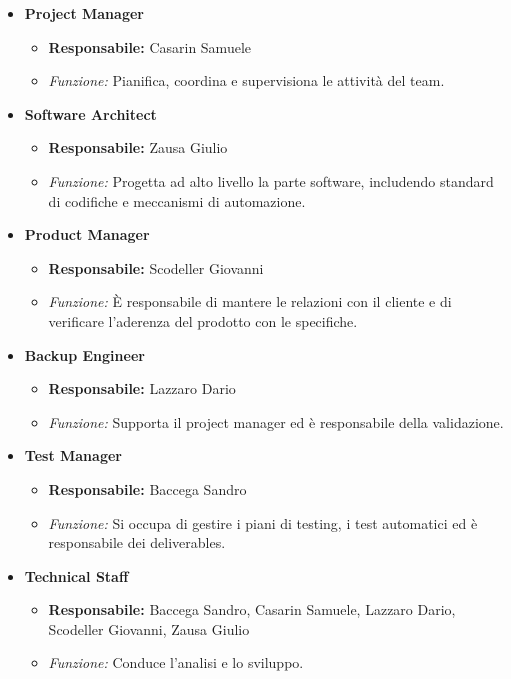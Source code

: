 \documentclass{article}
\begin{document}
  \begin{itemize}
  \item
    \textbf{Project Manager}
  
    \begin{itemize}
    \item
      \textbf{Responsabile:} Casarin Samuele
    \item
      \textit{Funzione: }Pianifica, coordina e supervisiona le attività del team.
    \end{itemize}
  \item
    \textbf{Software Architect}
  
    \begin{itemize}
    \item
      \textbf{Responsabile:} Zausa Giulio
    \item
      \textit{Funzione: }Progetta ad alto livello la parte software, includendo
      standard di codifiche e meccanismi di automazione.
    \end{itemize}
  \item
    \textbf{Product Manager}
  
    \begin{itemize}
    \item
      \textbf{Responsabile:} Scodeller Giovanni
    \item
      \textit{Funzione: }È responsabile di mantere le relazioni con il cliente e di
      verificare l'aderenza del prodotto con le specifiche.
    \end{itemize}
  \item
    \textbf{Backup Engineer}
  
    \begin{itemize}
    \item
      \textbf{Responsabile:} Lazzaro Dario
    \item
      \textit{Funzione: }Supporta il project manager ed è responsabile della
      validazione.
    \end{itemize}
  \item
    \textbf{Test Manager}
  
    \begin{itemize}
    \item
      \textbf{Responsabile:} Baccega Sandro
    \item
      \textit{Funzione: }Si occupa di gestire i piani di testing, i test automatici
      ed è responsabile dei deliverables.
    \end{itemize}
  \item
    \textbf{Technical Staff}
  
    \begin{itemize}
    \item
      \textbf{Responsabile:} Baccega Sandro, Casarin Samuele, Lazzaro Dario, Scodeller Giovanni, Zausa Giulio
    \item
      \textit{Funzione: }Conduce l'analisi e lo sviluppo.
    \end{itemize}
  \end{itemize}
  
\end{document}
